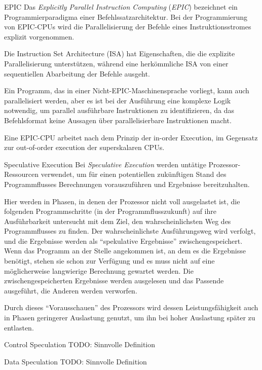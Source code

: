 \begin{defi}[Befehlssatzarchitektur]{EPIC}
    Das \emph{Explicitly Parallel Instruction Computing} (\emph{EPIC}) bezeichnet ein Programmierparadigma einer Befehlssatzarchitektur.
    Bei der Programmierung von EPIC-CPUs wird die Parallelisierung der Befehle eines Instruktionsstromes explizit vorgenommen.

    Die Instruction Set Architecture (ISA) hat Eigenschaften, die die explizite Parallelisierung unterstützen, während eine herkömmliche ISA von einer sequentiellen Abarbeitung der Befehle ausgeht.

    Ein Programm, das in einer Nicht-EPIC-Maschinensprache vorliegt, kann auch parallelisiert werden, aber es ist bei der Ausführung eine komplexe Logik notwendig, um parallel ausführbare Instruktionen zu identifizieren, da das Befehlsformat keine Aussagen über parallelisierbare Instruktionen macht.

    Eine EPIC-CPU arbeitet nach dem Prinzip der in-order Execution, im Gegensatz zur out-of-order execution der superskalaren CPUs.
\end{defi}

\begin{defi}{Speculative Execution}
    Bei \emph{Speculative Execution} werden untätige Prozessor-Ressourcen verwendet, um für einen potentiellen zukünftigen Stand des Programmflusses Berechnungen vorauszuführen und Ergebnisse bereitzuhalten.

    Hier werden in Phasen, in denen der Prozessor nicht voll ausgelastet ist, die folgenden Programmschritte (in der Programmflusszukunft) auf ihre Ausführbarkeit untersucht mit dem Ziel, den wahrscheinlichsten Weg des Programmflusses zu finden.
    Der wahrscheinlichste Ausführungsweg wird verfolgt, und die Ergebnisse werden als \enquote{spekulative Ergebnisse} zwischengespeichert.
    Wenn das Programm an der Stelle angekommen ist, an dem es die Ergebnisse benötigt, stehen sie schon zur Verfügung und es muss nicht auf eine möglicherweise langwierige Berechnung gewartet werden.
    Die zwischengespeicherten Ergebnisse werden ausgelesen und das Passende ausgeführt, die Anderen werden verworfen.

    Durch dieses \enquote{Vorausschauen} des Prozessors wird dessen Leistungsfähigkeit auch in Phasen geringerer Auslastung genutzt, um ihn bei hoher Auslastung später zu entlasten.
\end{defi}

\begin{defi}{Control Speculation}
    TODO: Sinnvolle Definition
\end{defi}

\begin{defi}{Data Speculation}
    TODO: Sinnvolle Definition
\end{defi}
